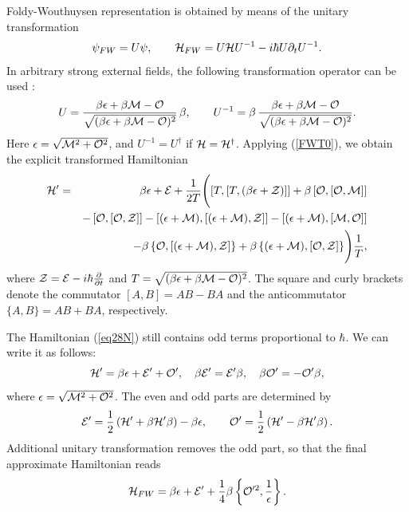 \documentclass[preprint,showpacs,preprintnumbers,eqsecnum,amsmath,amssymb]{revtex4-1}
\begin{document}
Foldy-Wouthuysen representation is obtained by means of the unitary
transformation
\begin{equation}
\psi_{FW} = U\psi,\qquad {\cal H}_{FW} = U{\cal H}U^{-1}
- i\hbar U\partial_tU^{-1}.\label{FWT0}
\end{equation}
In arbitrary strong external fields, the following transformation operator
can be used \cite{PRA}:
\begin{equation}
U = \frac{\beta\epsilon+\beta {\cal M}-{\cal
O}}{\sqrt{(\beta\epsilon+\beta {\cal M}-{\cal O})^2}}\,\beta,\qquad
U^{-1}=\beta\,\frac{\beta\epsilon+\beta{\cal M}-{\cal
O}}{\sqrt{(\beta\epsilon+\beta{\cal M}-{\cal O})^2}}.\label{4eq18}
\end{equation}
Here  $\epsilon=\sqrt{{\cal M}^2+{\cal O}^2}$, and $U^{-1} = U^\dagger$ if
${\cal H}={\cal H}^\dagger$. Applying (\ref{FWT0}), we obtain the explicit
transformed Hamiltonian
\begin{eqnarray}
{\cal H}' &=& \beta\epsilon+{\cal E}+ \frac{1}{2T}\Biggl(\left[T,\left[
T,(\beta\epsilon+{\cal Z})\right]\right] +\beta\left[{\cal O},[{\cal O},
{\cal M}]\right]\nonumber\\
&& - \left[{\cal O},\left[{\cal O},{\cal Z}\right]\right] - \left[(\epsilon
+{\cal M}),\left[(\epsilon+{\cal M}),{\cal Z}\right]\right] - \left[(\epsilon
+{\cal M}),\left[{\cal M},{\cal O}\right]\right]\nonumber\\
&& -\beta \left\{{\cal O},\left[(\epsilon+{\cal M}),{\cal Z}\right]\right\}
+\beta \left\{(\epsilon+{\cal M}),\left[{\cal O},{\cal Z}\right]\right\}
\Biggr)\frac{1}{T},\label{eq28N}
\end{eqnarray}
where ${\cal Z}={\cal E}-i\hbar\frac{\partial}{\partial t}$ and
$T=\sqrt{(\beta\epsilon+\beta{\cal M}-{\cal O})^2}$. The square and curly
brackets denote the commutator $[A,B] = AB - BA$ and
the anticommutator $\{A,B\} = AB + BA$, respectively.

The Hamiltonian (\ref{eq28N}) still contains odd terms proportional to $\hbar$.
We can write it as follows:
\begin{equation}
{\cal H}' = \beta\epsilon+{\cal E}'+{\cal O}',\quad\beta{\cal E}'={\cal
E}'\beta, \quad\beta{\cal O}'=-{\cal O}'\beta,
\label{4eq27}
\end{equation}
where $\epsilon=\sqrt{{\cal M}^2+{\cal O}^2}$. The even and odd parts are
determined by
\begin{equation}
{\cal E}'=\frac12\left({\cal H}'+\beta{\cal H}'\beta\right)-\beta\epsilon,\qquad
{\cal O}'=\frac12\left({\cal H}'-\beta{\cal H}'\beta\right).\label{EO}
\end{equation}
Additional unitary transformation removes the odd part, so that
the final approximate Hamiltonian reads \cite{PRA}
\begin{equation}
{\cal H}_{FW}=\beta\epsilon+{\cal E}'+\frac14\beta\left\{{\cal
O}'^2,\frac{1}{\epsilon}\right\}.\label{eqf}
\end{equation}
\end{document}
